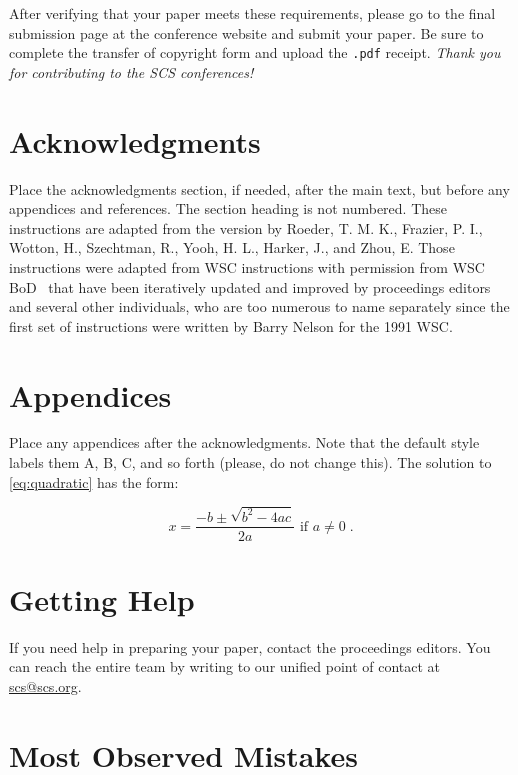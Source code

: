 \documentclass{scspaperproc}
\theoremstyle{scsthe}
\begin{document}
After verifying that your paper meets these requirements, please go to the final submission page at the conference website and submit your paper. Be sure to complete the transfer of copyright form and upload the \texttt{.pdf} receipt. \textit{Thank you for contributing to the SCS conferences!}


\section*{Acknowledgments}

Place the acknowledgments section, if needed, after the main text, but before any appendices and references. The section heading is not numbered. These instructions are adapted from the version by Roeder, T. M. K., Frazier, P. I., Wotton, H., Szechtman, R., Yooh, H. L., Harker, J., and Zhou, E. Those instructions were adapted from WSC instructions with permission from WSC BoD~\cite{WSC} that have been iteratively updated and improved by proceedings editors and several other individuals, who are too numerous to name separately since the first set of instructions were written by Barry Nelson for the 1991 WSC.

\appendix

\section{Appendices} \label{app:quadratic}
Place any appendices after the acknowledgments. Note that the default style labels them A, B, C, and so forth (please, do not change this). 
The solution to \eqref{eq:quadratic} has the form:

\begin{equation} \label{eq:quadratic sol}
x = \frac{-b \pm \sqrt{b^2-4ac}}{2a} \mbox{ if } a \ne 0\;.
\end{equation}


\section{Getting Help}
If you need help in preparing your paper, contact the proceedings editors. You can reach the entire team by writing to our unified point of contact at \href{mailto://scs@scs.org}{scs@scs.org}. 


\section{Most Observed Mistakes}
\end{document}
